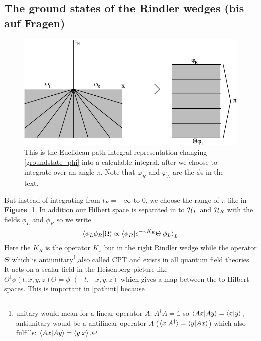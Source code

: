 \subsection{The ground states of the Rindler wedges \checkmark (bis auf Fragen)} \label{groundstate_rindler_wedges}
	\begin{figure}[tbp]
		\begin{center}
			\includegraphics[scale=1]{eucpath}
			\caption{This is the Euclidean path integral representation changing \eqref{groundstate_phi} into a calculable integral, after we choose to integrate over an angle $\pi$. Note that $\varphi_R$ and $\varphi_L$ are the $\phi$s in the text.}\label{eucpath}
		\end{center}
	\end{figure}
	But instead of integrating from $t_E= -\infty$ to 0, we choose the range of $\pi$ like in \textbf{Figure~\ref{eucpath}}. In addition our Hilbert space is separated in to $\mathcal{H}_L$ and $\mathcal{H}_R$ with the fields $\phi_L$ and $\phi_R$ so we write 
	\begin{align} \label{pathint}
		\braket{\phi_L \phi_R | \Omega} \propto \braket{\phi_R| e^{-\pi K_R} \Theta| \phi_L}_L
	\end{align}
	Here the $K_R$ is the operator $K_x$ but in the right Rindler wedge while the operator $\Theta$ which is antiunitary\footnote{unitary would mean for a linear operator $A$: $A^\dagger A = \mathds{1}$ so $\braket{Ax|Ay}=\braket{x|y}$, antiunitary would be a antilinear operator $A$ ($\braket{x|A^\dagger}=\braket{y|Ax}$) which also fulfills: $\braket{Ax|Ay}=\braket{y|x}$. },also called CPT and exists in all quantum field theories. It acts on a scalar field in the Heisenberg picture like $\Theta^\dagger \phi(t,x,y,z)\Theta = \phi^\dagger(-t,-x,y,z)$ which gives a map between the to Hilbert spaces. This is important in \eqref{pathint} because 
